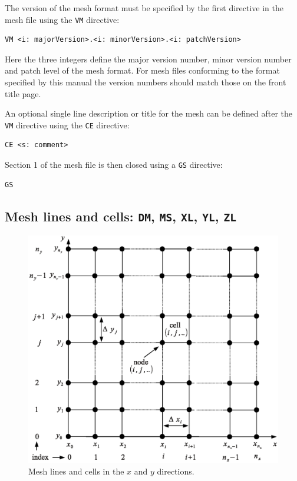 \documentclass[onecolumn,a4paper]{article}
\numberwithin{equation}{section}
\begin{document}
The version of the mesh format must be specified by the first directive in the mesh file using the 
\texttt{VM} directive:
\begin{verbatim}
VM <i: majorVersion>.<i: minorVersion>.<i: patchVersion>
\end{verbatim}
Here the three integers define the major version number, minor version number and patch
level of the mesh format. For mesh files conforming to the format specified by this manual
the version numbers should match those on the front title page. 

An optional single line description or title for the mesh can be defined after the 
\texttt{VM} directive using the \texttt{CE} directive:
\begin{verbatim}
CE <s: comment>
\end{verbatim}
Section 1 of the mesh file is then closed using a \texttt{GS} directive:
\begin{verbatim}
GS
\end{verbatim}

\subsection{Mesh lines and cells: \texttt{DM}, \texttt{MS}, \texttt{XL}, \texttt{YL}, \texttt{ZL}}

\begin{figure}[ht]
\centerline{\includegraphics[width=12cm]{figures/meshdefn}}
\caption{\label{fg:meshdefn} Mesh lines and cells in the $x$ and $y$ directions.}
\end{figure}
\end{document}
